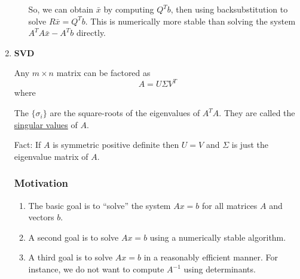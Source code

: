 \begin{enumerate}[label=(\roman*)]
\begin{enumerate}[label=(\alph*)]
        So, we can obtain $\bar{x}$ by computing $Q^Tb$, then using backsubstitution to solve $R\bar{x} = Q^Tb$. This is numerically more stable than solving the system $A^TA\bar{x} - A^Tb$ directly.
    \end{enumerate}
    
    \item \textbf{SVD}
    
    Any $m \times n$ matrix can be factored as 
    \[
        A = U \Sigma V^T
    \]
    where 
    
    The $\{\sigma_i\}$ are the square-roots of the eigenvalues of $A^TA$. They are called the \underline{singular values} of $A$.
    
    Fact: If $A$ is symmetric positive definite then $U=V$ and $\Sigma$ is just the eigenvalue matrix of $A$.
    
    \subsubsection*{Motivation}
    \begin{enumerate}[label=(\roman*)]
        \item The basic goal is to ``solve'' the system $Ax=b$ for all matrices $A$ and vectors $b$.
        \item A second goal is to solve $Ax=b$ using a numerically stable algorithm.
        \item A third goal is to solve $Ax=b$ in a reasonably efficient manner. For instance, we do not want to compute $A^{-1}$ using determinants.
    \end{enumerate}
    

\end{enumerate}
